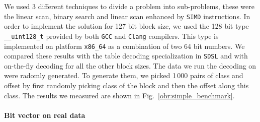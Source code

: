We used 3 different techniques to divide a problem into sub-problems, these were the linear scan,
binary search and linear scan enhanced by \texttt{SIMD} instructions. In order to implement the
solution for 127 bit block size, we used the 128 bit type \texttt{\_\_uint128\_t} provided by both
\texttt{GCC} and \texttt{Clang} compilers. This type is implemented on platform \texttt{x86\_64}
as a combination of two 64 bit numbers. We compared these results with the table decoding specialization
in \texttt{SDSL} and with on-the-fly decoding for all the other block sizes. The data we run the decoding
on were radomly generated. To generate them, we picked 1\,000 pairs of class and offset by first randomly
picking class of the block and then the offset along this class. The results we measured are shown in
Fig.~\ref{obr:simple_benchmark}.

\paragraph{Bit vector on real data}


